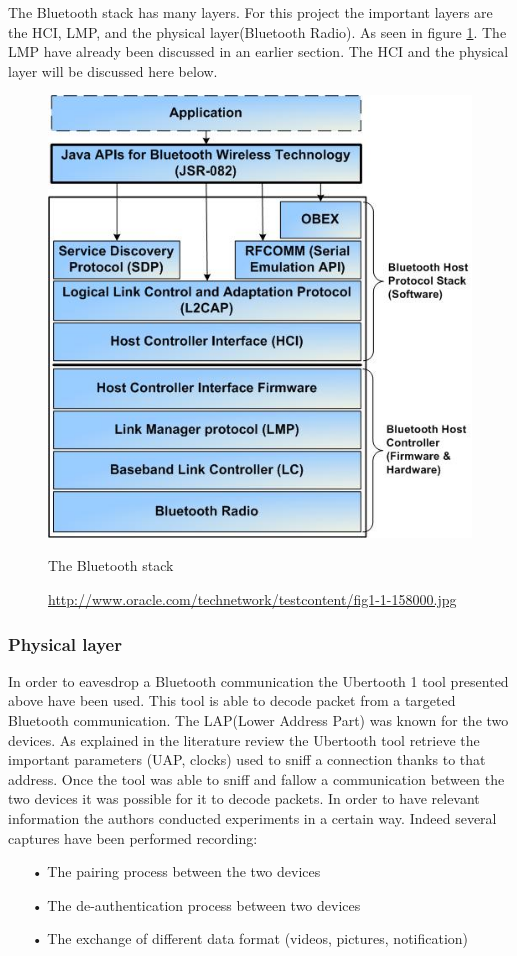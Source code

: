 The Bluetooth stack has many layers. For this project the important layers are the HCI, LMP, and the physical layer(Bluetooth Radio). As seen in figure \ref{fig:bt_stack}. The LMP have already been discussed in an earlier section. The HCI and the physical layer will be discussed here below.

\begin{figure}[h]
  \includegraphics[scale=0.8]{images/bluetoothstack.jpg}
  \caption{The Bluetooth stack}
  \label{fig:bt_stack}
  \caption*{\url{http://www.oracle.com/technetwork/testcontent/fig1-1-158000.jpg}}
\end{figure}

\subsubsection{Physical layer}
	In order to eavesdrop a Bluetooth communication the Ubertooth 1 tool presented above have been used. This tool is able to decode packet from a targeted Bluetooth communication.
	The LAP(Lower Address Part) was known for the two devices. As explained in the literature review the Ubertooth tool retrieve the important parameters (UAP, clocks) used to sniff a connection thanks to that address. Once the tool was able to sniff and fallow a communication between the two devices it was possible for it to decode packets.
	In order to have relevant information the authors conducted experiments in a certain way. Indeed several captures have been performed recording:
\begin{itemize}
	\item[•] The pairing process between the two devices
	\item[•] The de-authentication process between two devices
	\item[•] The exchange of different data format (videos, pictures, notification) 
\end{itemize}
		 
